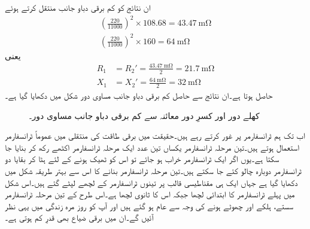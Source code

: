 ان نتائج کو کم برقی دباو جانب منتقل کرتے ہوئے 
\begin{align*}
\left(\frac{220}{11000} \right)^2 \times 108.68=\SI{43.47}{\milli \ohm}\\
\left(\frac{220}{11000} \right)^2 \times 160=\SI{64}{\milli \ohm}
\end{align*}
یعنی
\begin{align*}
R_1&=R_2'=\frac{\SI{43.47}{\milli \ohm}}{2}=\SI{21.7}{\milli \ohm}\\
X_1&=X_2'=\frac{\SI{64}{\milli \ohm}}{2}=\SI{32}{\milli \ohm}
\end{align*}
حاصل ہوتا ہے۔ان نتائج سے حاصل کم برقی دباو جانب مساوی دور شکل  میں دکھایا گیا ہے۔
\begin{figure}
\centering
\caption{کھلے دور اور کسرِ دور معائنہ سے کم برقی دباو جانب  مساوی دور۔}
\label{شکل_ٹرانسفارمر_کھلے_سرے_کسر_دور_مثال}
\end{figure}
%
اب تک ہم   ٹرانسفارمر پر غور کرتے رہے ہیں۔حقیقت میں برقی طاقت کی منتقلی میں عموماً  ٹرانسفارمر استعمال ہوتے ہیں۔تین مرحلہ ٹرانسفارمر یکساں تین عدد  ایک مرحلہ  ٹرانسفارمر اکٹھے رکھ کر بنایا جا سکتا ہے۔یوں اگر ایک ٹرانسفارمر خراب ہو جائے تو اس کو ٹھیک ہونے کے لئے ہٹا کر بقایا دو ٹرانسفارمر دوبارہ چالو کئے جا سکتے ہیں۔تین مرحلہ ٹرانسفارمر بنانے کا اس سے بہتر طریقہ شکل  میں دکھایا گیا ہے جہاں ایک ہی مقناطیسی قالب پر تینوں ٹرانسفارمر کے لچھے لپٹے گئے ہیں۔اس شکل میں  پہلے ٹرانسفارمر کا ابتدائی لچھا جبکہ  اس کا ثانوی لچھا ہے۔اس طرح کے تین مرحلہ ٹرانسفارمر سستے، ہلکے اور چھوٹے ہونے کی وجہ سے عام ہو گئے ہیں اور آپ کو روز مرہ زندگی میں یہی نظر آئیں گے۔ان میں برقی ضیاع بھی قدرِ کم ہوتی ہے۔
